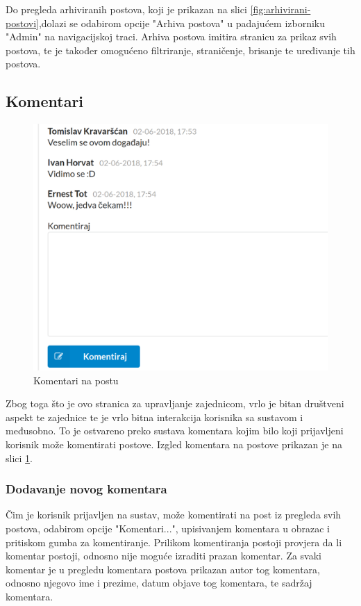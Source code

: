 \documentclass[zavrsni, numeric]{fer}
\begin{document}
Do pregleda arhiviranih postova, koji je prikazan na slici \ref{fig:arhivirani-postovi},dolazi se odabirom opcije "Arhiva postova" u padajućem izborniku "Admin" na navigacijskoj traci. Arhiva postova imitira stranicu za prikaz svih postova, te je također omogućeno filtriranje, straničenje, brisanje te uređivanje tih postova.

\subsection{Komentari}

\begin{figure}[H]
	\centering
	\includegraphics[width=13cm]{slike/komentari.png}
	\caption{Komentari na postu}
	\label{fig:komentari}
\end{figure}

Zbog toga što je ovo stranica za upravljanje zajednicom, vrlo je bitan društveni aspekt te zajednice te je vrlo bitna interakcija korisnika sa sustavom i međusobno. To je ostvareno preko sustava komentara kojim bilo koji prijavljeni korisnik može komentirati postove. Izgled komentara na postove prikazan je na slici \ref{fig:komentari}.

\subsubsection{Dodavanje novog komentara}

Čim je korisnik prijavljen na sustav, može komentirati na post iz pregleda svih postova, odabirom opcije "Komentari...", upisivanjem komentara u obrazac i pritiskom gumba za komentiranje. Prilikom komentiranja postoji provjera da li komentar postoji, odnosno nije moguće izraditi prazan komentar. Za svaki komentar je u pregledu komentara postova prikazan autor tog komentara, odnosno njegovo ime i prezime, datum objave tog komentara, te sadržaj komentara.
\end{document}
